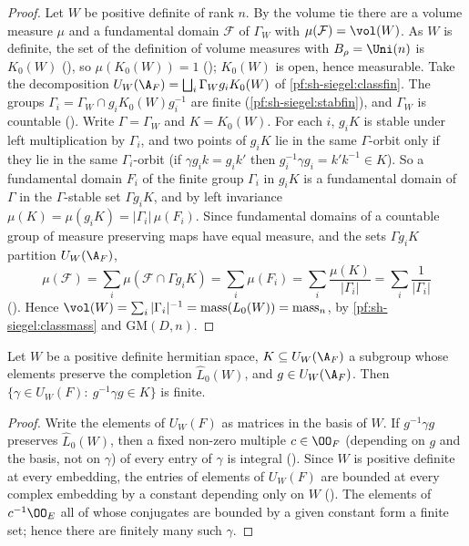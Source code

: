 \begin{proof}
Let $W$ be positive definite of rank $n$. By the volume tie there are a volume measure $\mu$ and a fundamental domain
$\mathcal F$ of $\Gamma_W$ with $\mu(\mathcal F)=\vol(W)$. As $W$ is definite, the set of the definition of volume measures with
$B_\rho=\Uni(n)$ is $K_0(W)$ (), so
$\mu(K_0(W))=1$ (); $K_0(W)$ is open, hence
measurable. Take the decomposition $U_W(\A_F)=\bigsqcup_i\Gamma_Wg_iK_0(W)$ of \cref{pf:sh-siegel:classfin}. The groups
$\Gamma_i=\Gamma_W\cap g_iK_0(W)g_i^{-1}$ are finite (\cref{pf:sh-siegel:stabfin}), and $\Gamma_W$ is countable
(). Write $\Gamma=\Gamma_W$ and $K=K_0(W)$.
For each $i$, $g_iK$ is stable under left multiplication by $\Gamma_i$, and two points of $g_iK$ lie in the same
$\Gamma$-orbit only if they lie in the same $\Gamma_i$-orbit (if $\gamma g_ik=g_ik'$ then $g_i^{-1}\gamma g_i=k'k^{-1}\in K$). So a
fundamental domain $F_i$ of the finite group $\Gamma_i$ in $g_iK$ is a fundamental domain of $\Gamma$ in the $\Gamma$-stable set
$\Gamma g_iK$, and by left invariance $\mu(K)=\mu(g_iK)=|\Gamma_i|\,\mu(F_i)$. Since fundamental domains of a countable group of
measure preserving maps have equal measure, and the sets $\Gamma g_iK$ partition $U_W(\A_F)$,
\[
\mu(\mathcal F)=\sum_i\mu(\mathcal F\cap\Gamma g_iK)=\sum_i\mu(F_i)=\sum_i\frac{\mu(K)}{|\Gamma_i|}=\sum_i\frac1{|\Gamma_i|}
\]
(). Hence
$\vol(W)=\sum_i|\Gamma_i|^{-1}=\mathrm{mass}(L_0(W))=\mathrm{mass}_n$, by \cref{pf:sh-siegel:classmass} and $\mathrm{GM}(D,n)$.
\end{proof}

\begin{lemma}\label{pf:sh-siegel:stabfin}
Let $W$ be a positive definite hermitian space, $K\subseteq U_W(\A_F)$ a subgroup whose elements preserve the completion
$\widehat L_0(W)$, and $g\in U_W(\A_F)$. Then $\{\gamma\in U_W(F):\ g^{-1}\gamma g\in K\}$ is finite.
\end{lemma}

\begin{proof}
Write the elements of $U_W(F)$ as matrices in the basis of $W$. If $g^{-1}\gamma g$ preserves $\widehat L_0(W)$, then a fixed
non-zero multiple $c\in\OO_F$ (depending on $g$ and the basis, not on $\gamma$) of every entry of $\gamma$ is integral
(). Since $W$ is positive definite at every embedding,
the entries of elements of $U_W(F)$ are bounded at every complex embedding by a constant depending only on $W$
(). The elements of $c^{-1}\OO_E$ all of whose
conjugates are bounded by a given constant form a finite set; hence there are finitely many such $\gamma$.
\end{proof}

